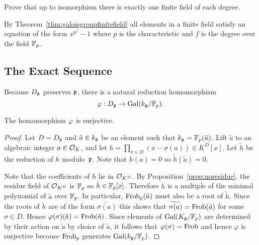 \begin{exercise}
	Prove that up to isomorphism there is
	exactly one finite field of each degree.
	
	\begin{hint}
		By Theorem~\ref{thm:galoisgroupfinitefield}
		all elements in a finite field satisfy an equation
		of the form $x^{p^f} - 1$ where $p$ is the
		characteristic and $f$ is the degree over the
		field $\mathbb{F}_p$.
	\end{hint}
\end{exercise}


\subsection{The Exact Sequence}\label{sec:exactseq}
Because $D_{\mathfrak{p}}$ preserves $\mathfrak{p}$, there is a natural reduction homomorphism
$$
  \varphi:D_{\mathfrak{p}} \to \operatorname{Gal}(k_{\mathfrak{p}}/\mathbb{F}_p).
$$
\begin{theorem}\label{thm:redsurj}
The homomorphism $\varphi$ is surjective.
\end{theorem}
\begin{proof}
Let $D = D_{\mathfrak{p}}$ and $\tilde{a} \in  k_{\mathfrak{p}}$ be an element such that $ k_{\mathfrak{p}} = \mathbb{F}_p(\tilde{a})$.
Lift $\tilde{a}$ to an algebraic integer $a\in \mathcal{O}_K$, and let
$h=\prod_{\sigma\in {D}}(x-\sigma(a))\in K^D[x]$.
Let $\tilde{h}$ be the reduction of $h$ modulo~$\mathfrak{p}$.
Note that $h(a) = 0$ so $\tilde{h}(\tilde{a}) = 0$.

Note that the coefficients of $h$ lie in $\mathcal{O}_{K^D}$.
By Proposition~\ref{prop:noresidue}, the residue field of $\mathcal{O}_{K^D}$
is $\mathbb{F}_p$ so $\tilde{h}\in\mathbb{F}_p[x]$.
Therefore $\tilde{h}$ is a multiple of the minimal polynomial of
$\tilde{a}$ over $\mathbb{F}_p$. In particular, $\operatorname{Frob}_p(\tilde{a})$
must also be a root of $\tilde{h}$.
Since the roots of $\tilde{h}$ are of the form
$\widetilde{\sigma(a)}$ this shows that
$\widetilde{\sigma(a)} = \operatorname{Frob}(\tilde{a})$ for some $\sigma\in D$.
Hence $\varphi(\sigma)(\tilde{a}) = \operatorname{Frob}(\tilde{a})$. Since elements
of $\operatorname{Gal}(K_{\mathfrak{p}}/\mathbb{F}_p)$ are determined by their action on $\tilde{a}$
by choice of $\tilde{a}$, it follows that $\varphi(\sigma) = \operatorname{Frob}$
and hence $\varphi$ is surjective because $\operatorname{Frob}_p$
generates $\operatorname{Gal}(k_{\mathfrak{p}}/\mathbb{F}_p)$.
\end{proof}

